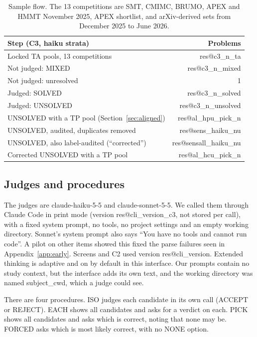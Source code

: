 \documentclass[10pt,twocolumn]{article}
\makeatletter
\newcommand{\res}[1]{\csname res@#1\endcsname}
\makeatother
\begin{document}
\begin{table}[t]
\centering\small
\begin{tabular}{p{5.2cm}r}
\toprule
Step (C3, haiku strata) & Problems \\
\midrule
Locked TA pools, 13 competitions & \res{c3_n_ta} \\
Not judged: MIXED & \res{c3_n_mixed} \\
Not judged: unresolved & 1 \\
Judged: SOLVED & \res{c3_n_solved} \\
Judged: UNSOLVED & \res{c3_n_unsolved} \\
UNSOLVED with a TP pool (Section~\ref{sec:aligned}) & \res{al_hpu_pick_n} \\
UNSOLVED, audited, duplicates removed & \res{sens_haiku_nu} \\
UNSOLVED, also label-audited (``corrected'') & \res{sensall_haiku_nu} \\
Corrected UNSOLVED with a TP pool & \res{al_hcu_pick_n} \\
\bottomrule
\end{tabular}
\caption{Sample flow. The 13 competitions are SMT, CMIMC, BRUMO, APEX and HMMT November 2025, APEX shortlist, and arXiv-derived sets from December 2025 to June 2026.}
\label{tab:flow}
\end{table}

\subsection{Judges and procedures}
The judges are claude-haiku-5-5 and claude-sonnet-5-5. We called them through Claude Code in print mode (version \res{cli_version_c3}, not stored per call), with a fixed system prompt, no tools, no project settings and an empty working directory. Sonnet's system prompt also says ``You have no tools and cannot run code''. A pilot on other items showed this fixed the parse failures seen in Appendix~\ref{app:early}. Screens and C2 used version \res{cli_version}. Extended thinking is adaptive and on by default in this interface. Our prompts contain no study context, but the interface adds its own text, and the working directory was named subject\_cwd, which a judge could see.

There are four procedures. ISO judges each candidate in its own call (ACCEPT or REJECT). EACH shows all candidates and asks for a verdict on each. PICK shows all candidates and asks which is correct, noting that none may be. FORCED asks which is most likely correct, with no NONE option.
\end{document}
